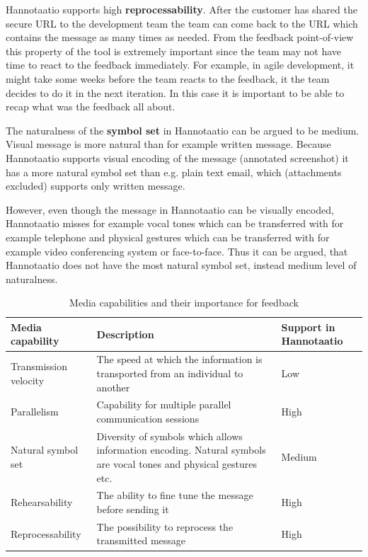 \documentclass[english,12pt,a4paper,pdftex]{article}
\begin{document}
Hannotaatio supports high \textbf{reprocessability}. After the customer has shared the secure \ac{URL} to the development team the team can come back to the \ac{URL} which contains the message as many times as needed. From the feedback point-of-view this property of the tool is extremely important since the team may not have time to react to the feedback immediately. For example, in agile development, it might take some weeks before the team reacts to the feedback, it the team decides to do it in the next iteration. In this case it is important to be able to recap what was the feedback all about.

The naturalness of the \textbf{symbol set} in Hannotaatio can be argued to be medium. Visual message is more natural than for example written message. Because Hannotaatio supports visual encoding of the message (annotated screenshot) it has a more natural symbol set than e.g. plain text email, which (attachments excluded) supports only written message.

However, even though the message in Hannotaatio can be visually encoded, Hannotaatio misses for example vocal tones which can be transferred with for example telephone and physical gestures which can be transferred with for example video conferencing system or face-to-face. Thus it can be argued, that Hannotaatio does not have the most natural symbol set, instead medium level of naturalness.

\begin{table}[!h]
\renewcommand{\arraystretch}{1.3}
\caption{Media capabilities and their importance for feedback}
\label{table:capabilities}
\centering
\begin{tabular}{|p{4cm}|p{7cm}|p{3cm}|}
\hline
\textbf{Media \newline capability} & \textbf{Description} & \textbf{Support in Hannotaatio}\\
\hline
Transmission \newline velocity & The speed at which the information is transported from an individual to another & Low\\
\hline
Parallelism & Capability for multiple parallel communication sessions & High\\
\hline
Natural symbol set & Diversity of symbols which allows information encoding. Natural symbols are vocal tones and physical gestures etc. & Medium\\
\hline
Rehearsability & The ability to fine tune the message before sending it & High\\
\hline
Reprocessability & The possibility to reprocess the transmitted message & High\\
\hline
\end{tabular}
\end{table}
\end{document}
